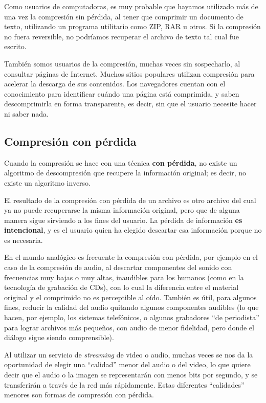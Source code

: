 \documentclass[spanish,a4paper,]{article}
\begin{document}
Como usuarios de computadoras, es muy probable que hayamos utilizado más
de una vez la compresión sin pérdida, al tener que comprimir un
documento de texto, utilizando un programa utilitario como ZIP, RAR u
otros. Si la compresión no fuera reversible, no podríamos recuperar el
archivo de texto tal cual fue escrito.

También somos usuarios de la compresión, muchas veces sin sospecharlo,
al consultar páginas de Internet. Muchos sitios populares utilizan
compresión para acelerar la descarga de sus contenidos. Los navegadores
cuentan con el conocimiento para identificar cuándo una página está
comprimida, y saben descomprimirla en forma transparente, es decir, sin
que el usuario necesite hacer ni saber nada.

\hypertarget{compresiuxf3n-con-puxe9rdida}{%
\subsection{Compresión con pérdida}\label{compresiuxf3n-con-puxe9rdida}}

Cuando la compresión se hace con una técnica \textbf{con pérdida}, no
existe un algoritmo de descompresión que recupere la información
original; es decir, no existe un algoritmo inverso.

El resultado de la compresión con pérdida de un archivo es otro archivo
del cual ya no puede recuperarse la misma información original, pero que
de alguna manera sigue sirviendo a los fines del usuario. La pérdida de
información \textbf{es intencional}, y es el usuario quien ha elegido
descartar esa información porque no es necesaria.

En el mundo analógico es frecuente la compresión con pérdida, por
ejemplo en el caso de la compresión de audio, al descartar componentes
del sonido con frecuencias muy bajas o muy altas, inaudibles para los
humanos (como en la tecnología de grabación de CDs), con lo cual la
diferencia entre el material original y el comprimido no es perceptible
al oído. También es útil, para algunos fines, reducir la calidad del
audio quitando algunos componentes audibles (lo que hacen, por ejemplo,
los sistemas telefónicos, o algunos grabadores ``de periodista'' para
lograr archivos más pequeños, con audio de menor fidelidad, pero donde
el diálogo sigue siendo comprensible).

Al utilizar un servicio de \emph{streaming} de video o audio, muchas
veces se nos da la oportunidad de elegir una ``calidad'' menor del audio
o del video, lo que quiere decir que el audio o la imagen se
representarán con menos bits por segundo, y se transferirán a través de
la red más rápidamente. Estas diferentes ``calidades'' menores son
formas de compresión con pérdida.
\end{document}
